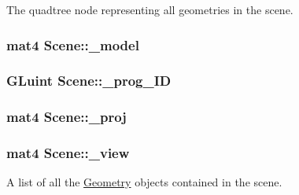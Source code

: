 The quadtree node representing all geometries in the scene. 

\hypertarget{class_scene_a2eea7478321942ad8f26f4555e1202c9}{
\subsubsection[{\+\_\+model}]{\setlength{\rightskip}{0pt plus 5cm}mat4 Scene\+::\+\_\+model}}\label{class_scene_a2eea7478321942ad8f26f4555e1202c9}
\hypertarget{class_scene_a30e431c913372130cd9f97c0c1e3d75e}{
\subsubsection[{\+\_\+prog\+\_\+\+I\+D}]{\setlength{\rightskip}{0pt plus 5cm}G\+Luint Scene\+::\+\_\+prog\+\_\+\+I\+D}}\label{class_scene_a30e431c913372130cd9f97c0c1e3d75e}
\hypertarget{class_scene_a7e980fe501bcaf6f173497d0a2190887}{
\subsubsection[{\+\_\+proj}]{\setlength{\rightskip}{0pt plus 5cm}mat4 Scene\+::\+\_\+proj}}\label{class_scene_a7e980fe501bcaf6f173497d0a2190887}
\hypertarget{class_scene_ae1b9af3642d66e6eff7d849c20aafdc5}{
\subsubsection[{\+\_\+view}]{\setlength{\rightskip}{0pt plus 5cm}mat4 Scene\+::\+\_\+view}}\label{class_scene_ae1b9af3642d66e6eff7d849c20aafdc5}


A list of all the \hyperlink{class_geometry}{Geometry} objects contained in the scene. 

